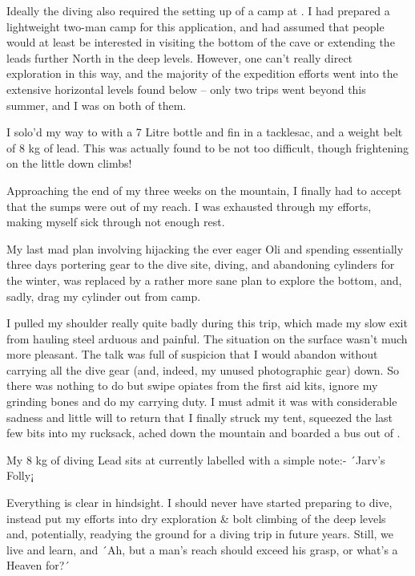 Ideally the diving also required the setting up of a camp at . I
had prepared a lightweight two-man camp for this application, and had
assumed that people would at least be interested in visiting the bottom
of the cave or extending the leads further North in the deep levels.
However, one can't really direct exploration in this way, and the
majority of the expedition efforts went into the extensive horizontal
levels found below  -- only two trips went
beyond  this summer, and I was on both of them.

I solo'd my way to  with a 7 Litre bottle and fin in a
tacklesac, and a weight belt of 8 kg of lead. This was actually found to
be not too difficult, though frightening on the little down climbs!

Approaching the end of my three weeks on the mountain, I finally had to
accept that the sumps were out of my reach. I was exhausted through my
efforts, making myself sick through not enough rest.

My last mad plan involving hijacking the ever eager Oli and spending
essentially three days portering gear to the dive site, diving, and
abandoning cylinders for the winter, was replaced by a rather more sane
plan to explore the bottom, and, sadly, drag my cylinder out from camp.

I pulled my shoulder really quite badly during this trip, which made my
slow exit from  hauling steel arduous and painful. The
situation on the surface wasn't much more pleasant. The  talk was
full of suspicion that I would abandon without carrying all the dive
gear (and, indeed, my unused photographic gear) down. So there was
nothing to do but swipe opiates from the first aid kits, ignore my
grinding bones and do my carrying duty. I must admit it was with
considerable sadness and little will to return that I finally struck my
tent, squeezed the last few bits into my rucksack, ached down the
mountain and boarded a bus out of .

My 8 kg of diving Lead sits at  currently labelled with a
simple note:- ´Jarv's Folly¡

Everything is clear in hindsight. I should never have started preparing
to dive, instead put my efforts into dry exploration \& bolt climbing of
the deep levels and, potentially, readying the ground for a diving trip
in future years. Still, we live and learn, and ´Ah, but a man's reach
should exceed his grasp, or what's a Heaven for?´

